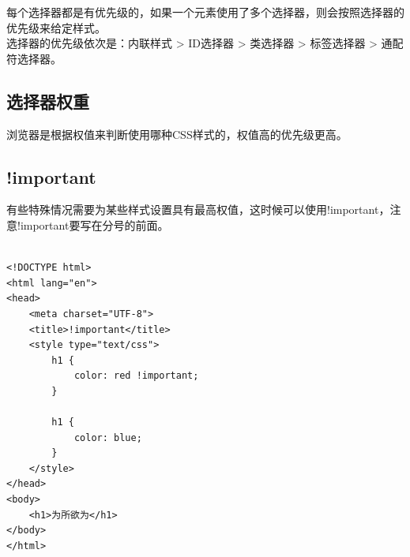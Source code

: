 每个选择器都是有优先级的，如果一个元素使用了多个选择器，则会按照选择器的优先级来给定样式。\\

选择器的优先级依次是：内联样式 > ID选择器 > 类选择器 > 标签选择器 > 通配符选择器。\\

\subsection{选择器权重}

浏览器是根据权值来判断使用哪种CSS样式的，权值高的优先级更高。

\begin{table}[H]
	\centering
	\caption{选择器权重}
\end{table}

\vspace{0.5cm}

\subsection{!important}

有些特殊情况需要为某些样式设置具有最高权值，这时候可以使用!important，注意!important要写在分号的前面。\\

\\

\begin{lstlisting}[style=htmlcssjs]
<!DOCTYPE html>
<html lang="en">
<head>
    <meta charset="UTF-8">
    <title>!important</title>
    <style type="text/css">
        h1 {
            color: red !important;
        }

        h1 {
            color: blue;
        }
    </style>
</head>
<body>
    <h1>为所欲为</h1>
</body>
</html>
\end{lstlisting}

